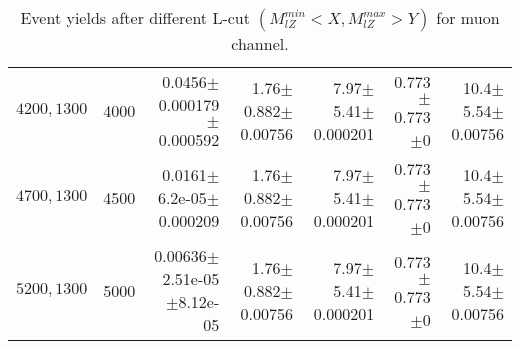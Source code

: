 \documentclass[]{article}
\begin{document}
\begin{table}
\begin{center}
{\begin{tabular}{ |r|r|r|r|r|r|r|}
$4200,1300$ & 4000 & 0.0456$\pm$0.000179$\pm$0.000592 & 1.76$\pm$0.882$\pm$0.00756 & 7.97$\pm$5.41$\pm$0.000201 & 0.773$\pm$0.773$\pm$0 & 10.4$\pm$5.54$\pm$0.00756 \\
$4700,1300$ & 4500 & 0.0161$\pm$6.2e-05$\pm$0.000209 & 1.76$\pm$0.882$\pm$0.00756 & 7.97$\pm$5.41$\pm$0.000201 & 0.773$\pm$0.773$\pm$0 & 10.4$\pm$5.54$\pm$0.00756 \\
$5200,1300$ & 5000 & 0.00636$\pm$2.51e-05$\pm$8.12e-05 & 1.76$\pm$0.882$\pm$0.00756 & 7.97$\pm$5.41$\pm$0.000201 & 0.773$\pm$0.773$\pm$0 & 10.4$\pm$5.54$\pm$0.00756 \\
\hline 
\end{tabular}
}
\end{center}
\caption{Event yields after different L-cut $(M_{lZ}^{min} < X, M_{lZ}^{max} > Y)$ for muon channel.}
\end{table}
\end{document}
